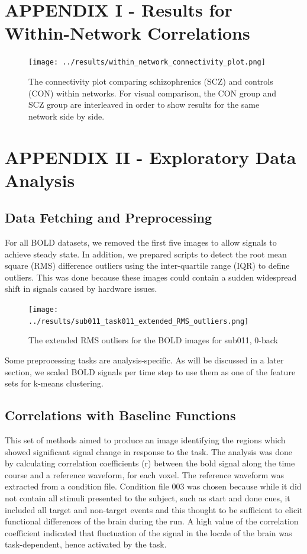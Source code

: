 \documentclass[11pt]{article}
\begin{document}
\newpage
\appendix

\section{APPENDIX I - Results for Within-Network Correlations}

\begin{figure}[H]
\centering
\texttt{[image: ../results/within\_network\_connectivity\_plot.png]}
\caption{The connectivity plot comparing schizophrenics (SCZ) and controls (CON) within networks. For visual comparison, the CON group and SCZ group are interleaved in order to show results for the same network side by side.}
\end{figure}

\section{APPENDIX II - Exploratory Data Analysis}

\subsection{Data Fetching and Preprocessing}

For all BOLD datasets, we removed the first five images to allow signals to
achieve steady state. In addition, we prepared scripts to detect the root mean
square (RMS) difference outliers using the inter-quartile range (IQR) to define
outliers. This was done because these images could contain a sudden widespread
shift in signals caused by hardware issues.

\begin{figure}[H]
\centering
\texttt{[image: ../results/sub011\_task011\_extended\_RMS\_outliers.png]}
\caption{The extended RMS outliers for the BOLD images for sub011, 0-back}
\end{figure} 

Some preprocessing tasks are analysis-specific. As will be discussed in a later
section, we scaled BOLD signals per time step to use them as one of the feature
sets for k-means clustering. 

\subsection{Correlations with Baseline Functions}

This set of methods aimed to produce an image identifying the regions which showed
significant signal change in response to the task. The analysis was done by calculating 
correlation coefficients (r) between the bold signal along the time course and a reference
waveform, for each voxel. The reference waveform was extracted from a condition file.
Condition file 003 was chosen because while it did not contain all stimuli presented to the
subject, such as start and done cues, it included all target and non-target events and this
thought to be sufficient to elicit functional differences of the brain during the run. 
A high value of the correlation coefficient indicated that fluctuation of the signal in 
the locale of the brain was task-dependent, hence activated by the task. 
\end{document}

